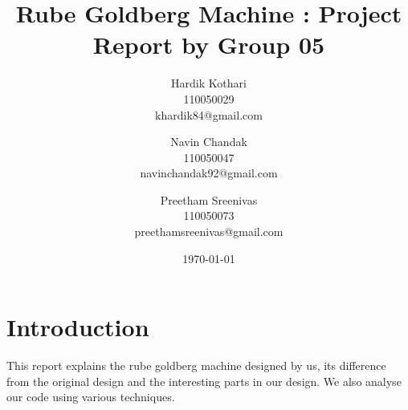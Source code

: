 \documentclass[english]{article}
\begin{document}
\title{Rube Goldberg Machine : Project Report by Group 05}
\author{Hardik Kothari\\
	110050029\\
	khardik84@gmail.com
	\and
	Navin Chandak\\
	110050047\\
	navinchandak92@gmail.com
	\and
	Preetham Sreenivas\\
	110050073\\
	preethamsreenivas@gmail.com
}
\date{\today}
\maketitle

\section{Introduction}
This report explains the rube goldberg machine designed by us, its difference from the original design and the interesting parts in our design. We also analyse our code using various techniques.
\end{document}
